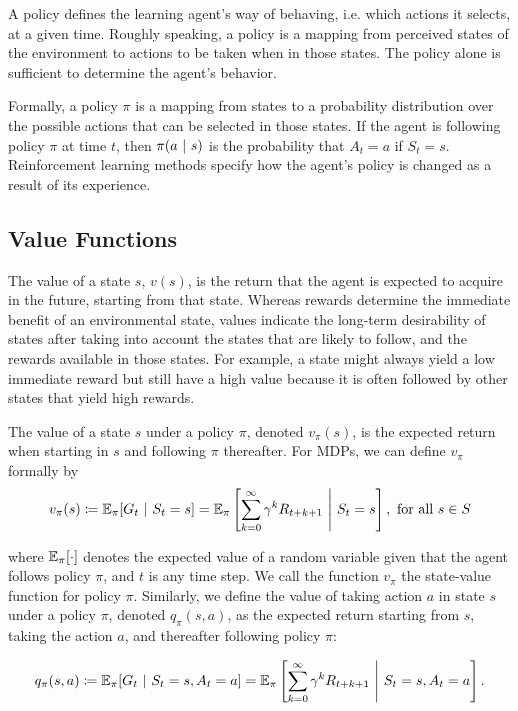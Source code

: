 A policy defines the learning agent’s way of behaving, i.e. which actions it selects, at a given time. Roughly speaking, a policy is a mapping from perceived states of the environment to actions to be taken when in those states. The policy alone is sufficient to determine the agent's behavior.

Formally, a policy $\pi$ is a mapping from states to a probability distribution over the possible actions that can be selected in those states. If the agent is following policy $\pi$ at time $t$, then $\pi(a \ |\  s)$ is the probability that $A_t = a$ if $S_t = s$. Reinforcement learning methods specify how the agent’s policy is changed as a result of its experience.

\subsection{Value Functions}

The value of a state $s$, $v(s)$, is the return that the agent is expected to acquire in the future, starting from that state. Whereas rewards determine the immediate benefit of an environmental state, values indicate the long-term desirability of states after taking into account the states that are likely to follow, and the rewards available in those states. For example, a state might always yield a low immediate reward but still have a high value because it is often followed by other states that yield high rewards.

The value of a state $s$ under a policy $\pi$, denoted $v_\pi(s)$, is the expected return when starting in $s$ and following $\pi$ thereafter. For MDPs, we can define $v_\pi$ formally by
\begin{equation}
    v_\pi(s) \coloneqq \mathbb{E}_\pi[G_t \ |\  S_t = s] = \mathbb{E}_\pi\left[\sum_{k=0}^{\infty} \gamma^k R_{t+k+1} \ \Biggr\rvert\  S_t = s\right], \text{ for all } s \in S
\end{equation}
    
where $\mathbb{E}_\pi[\cdot]$ denotes the expected value of a random variable given that the agent follows policy $\pi$, and $t$ is any time step. We call the function $v_\pi$ the state-value function for policy $\pi$.
Similarly, we define the value of taking action $a$ in state $s$ under a policy $\pi$, denoted $q_\pi(s, a)$, as the expected return starting from $s$, taking the action $a$, and thereafter following policy $\pi$:

\begin{equation}
    q_\pi(s, a) \coloneqq \mathbb{E}_\pi[G_t \ |\  S_t = s, A_t = a] = \mathbb{E}_\pi\left[\sum_{k=0}^{\infty} \gamma^k R_{t+k+1} \ \Biggr\rvert\  S_t = s, A_t = a\right].
\end{equation}


